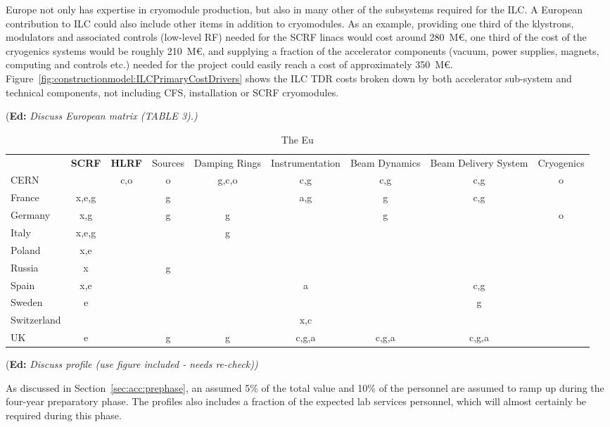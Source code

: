 \documentclass[%
 reprint,
 amsmath,amssymb,
 aps,
]{revtex4-1}
\newif\ifEdNotes \EdNotestrue
\newcommand{\doednote}[1]{{\color{red}(\textbf{Ed:} \textit{#1)}}}
\newcommand{\ednote}[1]{\ifEdNotes 
  \doednote{#1} 
\fi}
\begin{document}
Europe not only has expertise in cryomodule production, but also in many other 
of the subsystems required for the ILC. A European contribution to ILC could 
also include other items in addition to cryomodules. As an example, providing 
one third of the klystrons, modulators and associated controls (low-level RF) 
needed for the SCRF linacs would cost around 280~M\euro{}, one third of the cost of 
the cryogenics systems would be roughly 210~M\euro{}, and supplying a fraction of the 
accelerator components (vacuum, power supplies, magnets, computing and controls 
etc.) needed for the project could easily reach a cost of approximately 350~M\euro{}. 
Figure~\ref{fig:constructionmodel:ILCPrimaryCostDrivers} shows the ILC TDR costs broken down by both accelerator sub-system and 
technical components, not including CFS, installation or SCRF cryomodules.

\ednote{Discuss European matrix (TABLE 3).}

\begin{table}
\begin{tabular}{lcccccccc}
	&\bfseries SCRF	& \bfseries HLRF	&Sources&Damping Rings	&Instrumentation&Beam Dynamics	&Beam Delivery System	&Cryogenics \\
CERN	&	&c,o	&o	&g,c,o		&c,g		&c,g		&c,g			&o\\
France	&x,e,g	&	&g	&		&a,g		&g		&c,g			&\\
Germany	&x,g	&	&g	&g		&		&g		&			&o\\
Italy	&x,e,g	&	&	&g		&		&		&			&\\
Poland	&x,e	&	&	&		&		&		&			&\\
Russia	&x	&	&g	&		&		&		&			&\\
Spain	&x,e	&	&	&		&a		&		&c,g			&\\
Sweden	&e	&	&	&		&		&		&g			&\\
Switzerland& 	&	&	&		&x,c		&		&			&\\
UK	&e	&	&g	&g		&c,g,a		&c,g,a		&c,g,a			&\\
\end{tabular}
\caption{The Eu}
\end{table}


\ednote{Discuss profile (use figure included - needs re-check)}

As discussed in Section~\ref{sec:acc:prephase}, an assumed 5\% of the total value and 10\% of the personnel are assumed
to ramp up during the four-year preparatory phase. The profiles also includes a fraction
of the expected lab services personnel, which will almost certainly be required during this
phase. 
\end{document}
